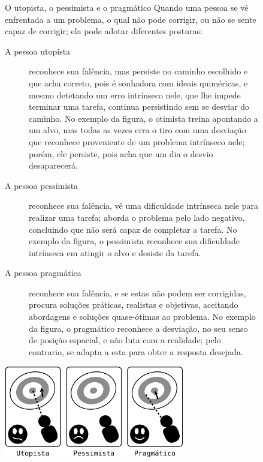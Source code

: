 \begin{figure}[!h]
\begin{elaboracion}{O utopista{,} o pessimista e o pragmático}
Quando uma pessoa se vê enfrentada a um problema, 
o qual não pode corrigir,
ou não se sente capaz de corrigir; ela pode adotar diferentes posturas:
\begin{description}
\item[A pessoa utopista] reconhece sua falência, mas persiste no caminho  escolhido
e que acha correto, pois é sonhadora com ideais quiméricas, 
e mesmo detetando um erro intrínseco nele, que lhe impede terminar uma tarefa,
continua persistindo sem se desviar do caminho.
No exemplo da figura, o otimista treina apontando a um alvo, 
mas todas as vezes erra o tiro com uma desviação que reconhece proveniente de um problema intrínseco nele;
porém, ele persiste, pois acha que um dia o desvio desaparecerá.
\item[A pessoa pessimista] reconhece sua falência, 
vê uma dificuldade intrínseca nele para realizar uma tarefa; aborda o problema pelo lado negativo,
concluindo que não será capaz de completar a tarefa.
No exemplo da figura, o pessimista reconhece sua dificuldade intrínseca em atingir o alvo
e desiste da tarefa. 
\item[A pessoa pragmática] reconhece sua falência, e se estas não podem ser corrigidas,
procura soluções práticas, realistas e objetivas, 
aceitando abordagens e soluções quase-ótimas ao problema.
No exemplo da figura, o pragmático reconhece a desviação,
 no seu senso de posição espacial, e não luta com a realidade; pelo contrario, se adapta a esta 
para obter a resposta desejada. 
\end{description}
\begin{center}
    \includegraphics[width=0.7\textwidth]{chapters/cap-body-control/problema-generico-completo.eps}
\end{center}
\end{elaboracion}
\end{figure}


